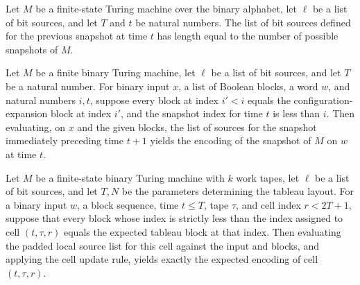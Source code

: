 \begin{theorem}
\label{Complexity.length_prevSnapSrcs}
\leanok
{}
Let $M$ be a finite-state Turing machine over the binary alphabet, let $\ell$ be a list
of bit sources, and let $T$ and $t$ be natural numbers. The list of bit sources defined
for the previous snapshot at time $t$ has length equal to the number of possible
snapshots of $M$.
\end{theorem}

\begin{theorem}
\label{Complexity.prevSnapSrcs_eval}
\leanok
{}
Let $M$ be a finite binary Turing machine, let $\ell$ be a list of bit sources, and let
$T$ be a natural number. For binary input $x$, a list of Boolean blocks, a word $w$, and
natural numbers $i,t$, suppose every block at index $i'<i$ equals the
configuration-expansion block at index $i'$, and the snapshot index for time $t$ is less
than $i$. Then evaluating, on $x$ and the given blocks, the list of sources for the
snapshot immediately preceding time $t+1$ yields the encoding of the snapshot of $M$ on
$w$ at time $t$.
\end{theorem}

\begin{theorem}
\label{Complexity.CfgTableau.cell_block}
\leanok
{}
Let $M$ be a finite-state binary Turing machine with $k$ work tapes, let $\ell$ be a
list of bit sources, and let $T,N$ be the parameters determining the tableau layout. For
a binary input $w$, a block sequence, time $t\le T$, tape $\tau$, and cell index
$r<2T+1$, suppose that every block whose index is strictly less than the index assigned
to cell $(t,\tau,r)$ equals the expected tableau block at that index. Then evaluating
the padded local source list for this cell against the input and blocks, and applying
the cell update rule, yields exactly the expected encoding of cell $(t,\tau,r)$.
\end{theorem}
